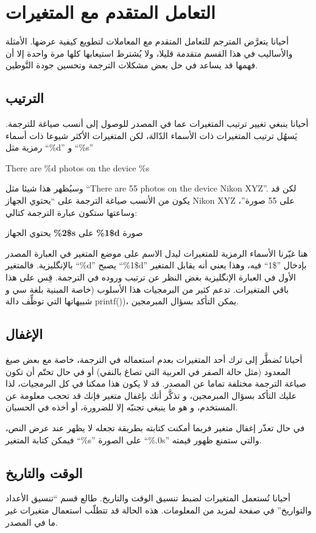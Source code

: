 \section[ref:43252826]{التعامل المتقدم مع المتغيرات}
أحيانا يتعرَّض المترجم للتعامل
المتقدم مع المعاملات لتطويع كيفية عرضها. الأمثلة والأساليب في هذا القسم
متقدمة قليلا، ولا يُشترط استيعابها كلها مرة واحدة إلا أن فهمها قد يساعد
في حل بعض مشكلات الترجمة وتحسين جودة التَّوطين.

\subsection{الترتيب}
أحيانا ينبغي تغيير ترتيب المتغيرات عما في المصدر للوصول إلى أنسب صياغة
للترجمة. يَسهُل ترتيب المتغيرات ذات الأسماء الدّالة، لكن المتغيرات
الأكثر شيوعا ذات أسماء رمزية مثل ‪“\%d”‬ و ‪“\%s”‬

There are \%d photos on the device \%s

وسيُظهر هذا شيئا مثل “There are 55 photos on the device Nikon XYZ”. لكن
قد يكون من الأنسب صياغة الترجمة على “يحتوي الجهاز Nikon XYZ على 55
صورة”، وساعتها ستكون عبارة الترجمة كتالي:

يحتوي الجهاز ‪{\bf \%2\$s}‬ على ‪{\bf \%1\$d}‬ صورة

هنا غيّرنا الأسماء الرمزية للمتغيرات ليدل الاسم على موضع المتغير في
العبارة المصدر بالإنگليزية. فالمتغير ‪“\%d”‬ يصبح ‪“\%1\$d”‬ بإدخال
”\$1“ فيه، وهذا يعني أنه يقابل المتغير الأول في العبارة الإنگليزية بغض
النظر عن ترتيب وروده في الترجمة. قِس على هذا باقي المتغيرات. تدعم كثير
من البرمجيات هذا الأسلوب (خاصة المبنية بلغة سي و شبيهاتها التي توظِّف
دالة ‪printf()‬)، يمكن التأكد بسؤال المبرمجين.

\subsection{الإغفال}
أحيانا نُضطَّر إلى ترك أحد المتغيرات بعدم استعماله في الترجمة، خاصة مع
بعض صيغ المعدود (مثل حالة الصفر في العربية التي تصاغ بالنفي) أو في حال
تحتّم أن تكون صياغة الترجمة مختلفة تماما عن المصدر. قد لا يكون هذا
ممكنا في كل البرمجيات، لذا عليك التأكد بسؤال المبرمجين، و تذكَّر أنك
بإغفال متغير فإنك قد تحجب معلومة عن المستخدم، و هو ما ينبغي تجنبّه إلا
للضرورة، أو أخذه في الحسبان.

في حال تعذّر إغفال متغير فربما أمكنت كتابته بطريقة تجعله لا يظهر عند عرض
النص، فيمكن كتابة المتغير ‪“\%s”‬ على الصورة ‪“\%.0s”‬ والتي ستمنع ظهور
قيمته.

\subsection[ref:43524426]{الوقت والتاريخ}
أحيانا تُستعمل المتغيرات لضبط
تنسيق الوقت والتاريخ. طالع قسم “تنسيق الأعداد والتواريخ” في صفحة
\at[ref:30596701] لمزيد من المعلومات. هذه الحالة قد تتطلّب
استعمال متغيرات غير ما في المصدر.

